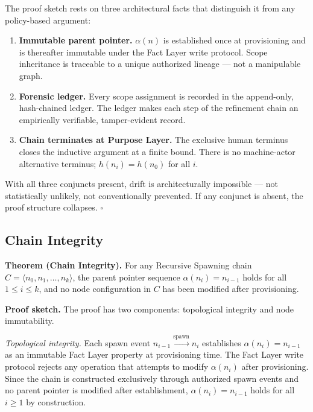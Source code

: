 \medskip
The proof sketch rests on three architectural facts that distinguish it from any policy-based argument:

\begin{enumerate}
    \item[(1)] \textbf{Immutable parent pointer.} $\alpha(n)$ is established once at provisioning and is thereafter immutable under the Fact Layer write protocol. Scope inheritance is traceable to a unique authorized lineage — not a manipulable graph.
    \item[(2)] \textbf{Forensic ledger.} Every scope assignment is recorded in the append-only, hash-chained ledger. The ledger makes each step of the refinement chain an empirically verifiable, tamper-evident record.
    \item[(3)] \textbf{Chain terminates at Purpose Layer.} The exclusive human terminus closes the inductive argument at a finite bound. There is no machine-actor alternative terminus; $h(n_i) = h(n_0)$ for all $i$.
\end{enumerate}

With all three conjuncts present, drift is architecturally impossible — not statistically unlikely, not conventionally prevented. If any conjunct is absent, the proof structure collapses. $\square$

\subsection{Chain Integrity}
\label{sec:rs-chain-integrity}

\medskip
\noindent\textbf{Theorem (Chain Integrity).} For any Recursive Spawning chain $C = \langle n_0, n_1, \ldots, n_k \rangle$, the parent pointer sequence $\alpha(n_i) = n_{i-1}$ holds for all $1 \leq i \leq k$, and no node configuration in $C$ has been modified after provisioning.

\medskip
\noindent\textbf{Proof sketch.} The proof has two components: topological integrity and node immutability.

\medskip
\textit{Topological integrity.} Each spawn event $n_{i-1} \xrightarrow{\mathrm{spawn}} n_i$ establishes $\alpha(n_i) = n_{i-1}$ as an immutable Fact Layer property at provisioning time. The Fact Layer write protocol rejects any operation that attempts to modify $\alpha(n_i)$ after provisioning. Since the chain is constructed exclusively through authorized spawn events and no parent pointer is modified after establishment, $\alpha(n_i) = n_{i-1}$ holds for all $i \geq 1$ by construction.

